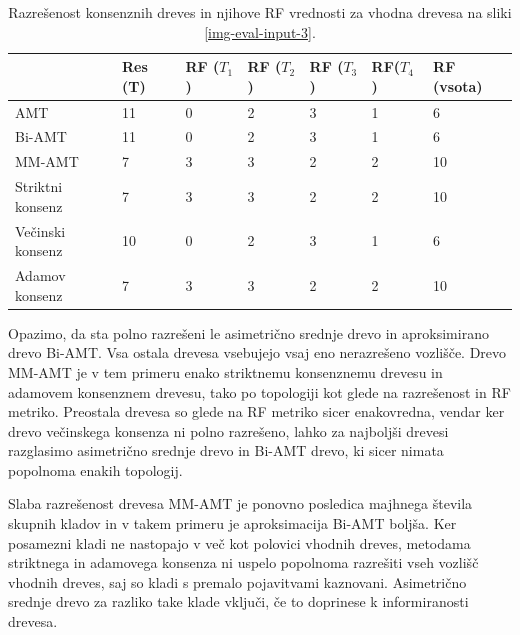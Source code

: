 \documentclass[a4paper, 12pt]{book}
\begin{document}
\begin{table}[h!]
	\begin{center}
	{\footnotesize
	\begin{tabular}{ l| l | l | l | l | l | l }
	~                & Res (T)      & RF ($T_1$) & RF ($T_2$)       & RF ($T_3$) & RF($T_4$) & RF (vsota) \\ \hline
	AMT              & 11          & 0          & 2                & 3          & 1         & 6          \\ \hline
	Bi-AMT           & 11          & 0          & 2                & 3          & 1         & 6          \\ \hline
	MM-AMT           & 7           & 3          & 3                & 2          & 2         & 10         \\ \hline
	Striktni konsenz & 7           & 3          & 3                & 2          & 2         & 10         \\ \hline
	Večinski konsenz & 10          & 0          & 2                & 3          & 1         & 6          \\ \hline
	Adamov konsenz   & 7           & 3          & 3                & 2          & 2         & 10         \\ \hline
	\end{tabular}
	\label{table-eval-3}
	\caption{Razrešenost konsenznih dreves in njihove RF vrednosti za vhodna drevesa na sliki \ref{img-eval-input-3}.}
	}
	\end{center}		
\end{table}

Opazimo, da sta polno razrešeni le asimetrično srednje drevo in aproksimirano drevo Bi-AMT. Vsa ostala drevesa vsebujejo
vsaj eno nerazrešeno vozlišče. Drevo MM-AMT je v tem primeru enako striktnemu konsenznemu drevesu in adamovem konsenznem
drevesu, tako po topologiji kot glede na razrešenost in RF metriko. Preostala drevesa so glede na RF metriko sicer 
enakovredna, vendar ker drevo večinskega konsenza ni polno razrešeno, lahko za najboljši drevesi razglasimo asimetrično 
srednje drevo in Bi-AMT drevo, ki sicer nimata popolnoma enakih topologij.

Slaba razrešenost drevesa MM-AMT je ponovno posledica majhnega števila skupnih kladov in v takem primeru je aproksimacija
Bi-AMT boljša. Ker posamezni kladi ne nastopajo v več kot polovici vhodnih dreves, metodama striktnega in adamovega konsenza
ni uspelo popolnoma razrešiti vseh vozlišč vhodnih dreves, saj so kladi s premalo pojavitvami kaznovani. Asimetrično srednje
drevo za razliko take klade vključi, če to doprinese k informiranosti drevesa.
\end{document}
